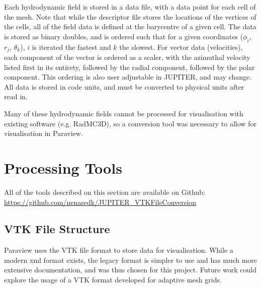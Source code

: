 \documentclass[twocolumn]{aastex62}
\begin{document}
Each hydrodynamic field is stored in a data file, with a data point for each cell of the mesh. Note that while the descriptor file stores the locations of the vertices of the cells, all of the field data is defined at the barycentre of a given cell. The data is stored as binary doubles, and is ordered such that for a given coordinates ($\phi_{i}$, $r_{j}$, $\theta_{k}$), $i$ is iterated the fastest and $k$ the slowest. For vector data (velocities), each component of the vector is ordered as a scaler, with the azimuthal velocity listed first in its entirety, followed by the radial component, followed by the polar component. This ordering is also user adjustable in JUPITER, and may change. All data is stored in code units, and must be converted to physical units after read in.

Many of these hydrodynamic fields cannot be processed for visualisation with existing software (e.g. RadMC3D), so a conversion tool was necessary to allow for visualisation in Paraview.
\section{Processing Tools}\label{sec:code}
All of the tools described on this section are available on Github: \url{https://github.com/nenasedk/JUPITER_VTKFileConversion}
\subsection{VTK File Structure}\label{sec:vtk}
Paraview uses the VTK file format to store data for visualisation. While a modern xml format exists, the legacy format is simpler to use and has much more extensive documentation, and was thus chosen for this project. Future work could explore the usage of a VTK format developed for adaptive mesh grids.
\end{document}
